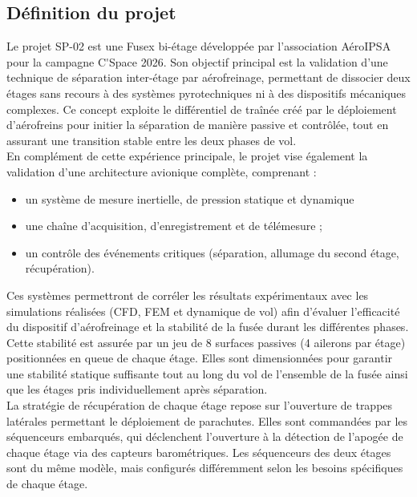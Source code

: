 \subsection{Définition du projet}
\label{subsec:def_projet}

Le projet SP-02 est une \gls{Fusex} bi-étage développée par l’association AéroIPSA pour la campagne \gls{C'Space} 2026.
Son objectif principal est la validation d’une technique de séparation inter-étage par aérofreinage, permettant de dissocier
deux étages sans recours à des systèmes pyrotechniques ni à des dispositifs mécaniques complexes. Ce concept exploite le
différentiel de traînée créé par le déploiement d’aérofreins pour initier la séparation de manière passive et contrôlée, tout en
assurant une transition stable entre les deux phases de vol.\\

En complément de cette expérience principale, le projet vise également la validation d’une architecture avionique complète,
comprenant :
\begin{itemize}
    \item un système de mesure inertielle, de pression statique et dynamique
    \item une chaîne d’acquisition, d’enregistrement et de télémesure ;
    \item un contrôle des événements critiques (séparation, allumage du second étage, récupération).\\
\end{itemize}

Ces systèmes permettront de corréler les résultats expérimentaux avec les simulations réalisées (\acrshort{CFD}, \acrshort{FEM}
et dynamique de vol) afin d’évaluer l’efficacité du dispositif d’aérofreinage et la stabilité de la fusée durant les différentes
phases.\\

Cette stabilité est assurée par un jeu de 8 surfaces passives (4 ailerons par étage) positionnées en queue de chaque étage.
Elles sont dimensionnées pour garantir une stabilité statique suffisante tout au long du vol de l'ensemble de la fusée ainsi que
les étages pris individuellement après séparation.\\

La stratégie de récupération de chaque étage repose sur l’ouverture de trappes latérales permettant le déploiement de
parachutes. Elles sont commandées par les séquenceurs embarqués, qui déclenchent l’ouverture à la détection de l’apogée de chaque
étage via des capteurs barométriques. Les séquenceurs des deux étages sont du même modèle, mais configurés différemment selon
les besoins spécifiques de chaque étage.\\

